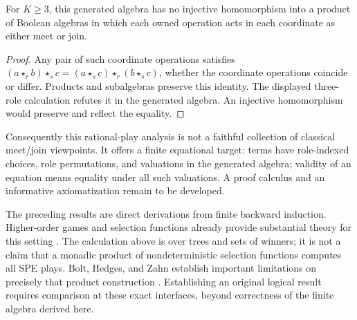 \begin{corollary}
\label{cor:no-boolean-product}
For $K\ge3$, this generated algebra has no injective homomorphism into a
product of Boolean algebras in which each owned operation acts in each
coordinate as either meet or join.
\end{corollary}
\begin{proof}
Any pair of such coordinate operations satisfies
$(a\star_r b)\star_s c
 =(a\star_s c)\star_r(b\star_s c)$, whether the coordinate operations
coincide or differ. Products and subalgebras preserve this identity.
The displayed three-role calculation refutes it in the generated algebra.
An injective homomorphism would preserve and reflect the equality.
\end{proof}

Consequently this rational-play analysis is not a faithful collection of
classical meet/join viewpoints. It offers a finite equational target:
terms have role-indexed choices, role permutations, and valuations in the
generated algebra; validity of an equation means equality under all such
valuations. A proof calculus and an informative axiomatization remain to
be developed.

The preceding results are direct derivations from finite backward
induction. Higher-order games and selection functions already provide
substantial theory for this setting \cite{EscardoOliva2023}.
The calculation above is over trees and sets of winners; it is not a
claim that a monadic product of nondeterministic selection functions
computes all SPE plays. Bolt, Hedges, and Zahn establish important
limitations on precisely that product construction
\cite{BoltHedgesZahn2019}. Establishing an original logical result requires
comparison at these exact interfaces, beyond correctness of the finite
algebra derived here.
